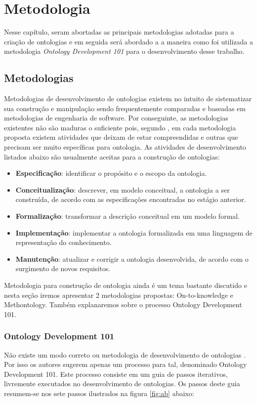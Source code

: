 \chapter{Metodologia}\label{cap3}

Nesse capítulo, seram abortadas as principais metodologias adotadas para a criação de ontologias e em seguida será abordado a a maneira como foi utilizada a metodologia \textit{Ontology Development 101} para o desenvolvimento desse trabalho.

\section{Metodologias}

Metodologias de desenvolvimento de ontologias existem no intuito de sistematizar sua construção e manipulação sendo frequentemente comparadas e baseadas em metodologias de engenharia de software. Por conseguinte, as metodologias existentes não são maduras o suficiente pois, segundo \cite{fenando}, em cada metodologia proposta existem atividades que deixam de estar compreendidas e outras que precisam ser muito específicas para ontologia. As atividades de desenvolvimento listados abaixo são usualmente aceitas para a construção de ontologias:
	
\begin{itemize}
 	\item \textbf{Especificação}: identificar o propósito e o escopo da ontologia.
 	\item \textbf{Conceitualização}: descrever, em modelo conceitual, a ontologia a ser construída, de acordo com as especificações encontradas no estágio anterior.
	\item \textbf{Formalização}: transformar a descrição conceitual em um modelo formal.
	\item \textbf{Implementação}: implementar a ontologia formalizada em uma linguagem de representação do conhecimento.
	\item \textbf{Manutenção}: atualizar e corrigir a ontologia desenvolvida, de acordo com o surgimento de novos requisitos.
\end{itemize}

Metodologia para construção de ontologia ainda é um tema bastante discutido e nesta seção iremos apresentar 2 metodologias propostas: On-to-knowledge e Methontology. Também explanaremos sobre o processo Ontology Development 101.

\subsection{Ontology Development 101}
Não existe um modo correto ou metodologia de desenvolvimento de ontologias \cite{MCGUINNESS}. Por isso os autores sugerem apenas um processo para tal, denominado Ontology Development 101. Este processo consiste em um guia de passos iterativos, livremente executados no desenvolvimento de ontologias. Os passos deste guia resumem-se nos sete passos ilustrados na figura \ref{fig:ab} abaixo:

